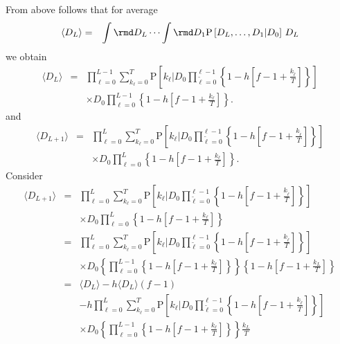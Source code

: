 \documentclass[10pt]{iopart}
\newcommand{\1}{\mathbf{1}}
\newcommand{\Prob}{\mathrm{P}}
\begin{document}
%
From above follows that for average 
%
\begin{eqnarray}
\langle D_{L}\rangle&=&\int\rmd D_{L}\cdots \int\rmd D_{1} \Prob\left[D_{L},\ldots,D_{1}\vert D_{0}\right]\,D_{L}
%
\end{eqnarray}
%
we obtain 
%
\begin{eqnarray}
%
\langle D_{L}\rangle&=&\prod_{\ell=0}^{L-1}\sum_{k_{\ell}=0}^T\Prob\left[k_\ell\Bigg\vert D_{0}\prod_{\tilde{\ell}=0}^{\ell-1}\left\{1- h\left[f- 1+\frac{k_{\tilde{\ell}}}{T}\right]\right\}\right]\nonumber\\
&&\times D_{0}\prod_{\ell=0}^{L-1}\left\{1- h\left[f- 1+\frac{k_{\ell}}{T}\right]\right\}\label{eq:aver-D}.
%
\end{eqnarray}
%
and
%
\begin{eqnarray}
%
\langle D_{L+1}\rangle&=&\prod_{\ell=0}^{L}\sum_{k_{\ell}=0}^T\Prob\left[k_\ell\Bigg\vert D_{0}\prod_{\tilde{\ell}=0}^{\ell-1}\left\{1- h\left[f- 1+\frac{k_{\tilde{\ell}}}{T}\right]\right\}\right]\nonumber\\
&&\times D_{0}\prod_{\ell=0}^{L}\left\{1- h\left[f- 1+\frac{k_{\ell}}{T}\right]\right\}.
%
\end{eqnarray}
%
Consider 
%
\begin{eqnarray}
%
\langle D_{L+1}\rangle&=&\prod_{\ell=0}^{L}\sum_{k_{\ell}=0}^T\Prob\left[k_\ell\Bigg\vert D_{0}\prod_{\tilde{\ell}=0}^{\ell-1}\left\{1- h\left[f- 1+\frac{k_{\tilde{\ell}}}{T}\right]\right\}\right]\nonumber\\
&&\times D_{0}\prod_{\ell=0}^{L}\left\{1- h\left[f- 1+\frac{k_{\ell}}{T}\right]\right\}\nonumber\\
%
&=&\prod_{\ell=0}^{L}\sum_{k_{\ell}=0}^T\Prob\left[k_\ell\Bigg\vert D_{0}\prod_{\tilde{\ell}=0}^{\ell-1}\left\{1- h\left[f- 1+\frac{k_{\tilde{\ell}}}{T}\right]\right\}\right]\nonumber\\
&&\times D_{0}\left\{\prod_{\ell=0}^{L-1}\left\{1- h\left[f- 1+\frac{k_{\ell}}{T}\right]\right\}\right\}\left\{1- h\left[f- 1+\frac{k_{L}}{T}\right]\right\}\nonumber\\
%
&=&\langle D_{L}\rangle- h\langle D_{L}\rangle(f- 1)\nonumber\\
%
&&-h\prod_{\ell=0}^{L}\sum_{k_{\ell}=0}^T\Prob\left[k_\ell\Bigg\vert D_{0}\prod_{\tilde{\ell}=0}^{\ell-1}\left\{1- h\left[f- 1+\frac{k_{\tilde{\ell}}}{T}\right]\right\}\right]\nonumber\\
%
&&\times D_{0}\left\{\prod_{\ell=0}^{L-1}\left\{1- h\left[f- 1+\frac{k_{\ell}}{T}\right]\right\}\right\}\frac{k_L}{T}
%
\end{eqnarray}
\end{document}
